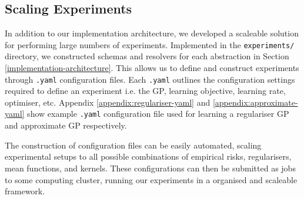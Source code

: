 \documentclass{article}
\def\code#1{\texttt{#1}}
\numberwithin{equation}{section}
\begin{document}
\subsection{Scaling Experiments}
In addition to our implementation architecture, we developed a scaleable solution for performing large numbers of experiments. 
Implemented in the \code{experiments/} directory, we constructed schemas and resolvers for each abstraction in Section \ref{implementation-architecture}. 
This allows us to define and construct experiments through \code{.yaml} configuration files. 
Each \code{.yaml} outlines the configuration settings required to define an experiment i.e. the GP, learning objective, learning rate, optimiser, etc. Appendix \ref{appendix:regulariser-yaml} and \ref{appendix:approximate-yaml} show example \code{.yaml} configuration file used for learning a regulariser GP and approximate GP respectively.

The construction of configuration files can be easily automated, scaling experimental setups to all possible combinations of empirical risks, regularisers, mean functions, and kernels. These configurations can then be submitted as jobs to some computing cluster, running our experiments in a organised and scaleable framework.
\end{document}
